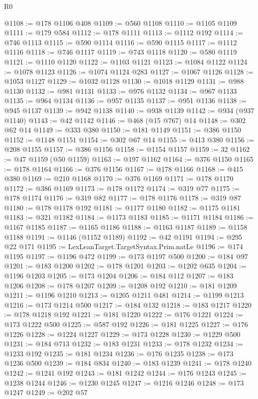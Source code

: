 \begin{lexlean}{R0}
\begin{coremodule}
@1108 := @178 @1106 @408
@1109 := @560 @1108
@1110 := @1105 @1109
@1111 := @179 @584
@1112 := @178 @1111
@1113 := @1112 @192
@1114 := @746 @1113
@1115 := @590 @1114
@1116 := @590 @1115
@1117 := @1112 @1116
@1118 := @746 @1117
@1119 := @743 @1118
@1120 := @580 @1119
@1121 := @1110 @1120
@1122 := @1103 @1121
@1123 := @1084 @1122
@1124 := @1078 @1123
@1126 := @1074 @1124 @283
@1127 := @1067 @1126
@1128 := @1053 @1127
@1129 := @1032 @1128
@1130 := @1018 @1129
@1131 := @988 @1130
@1132 := @981 @1131
@1133 := @976 @1132
@1134 := @967 @1133
@1135 := @964 @1134
@1136 := @957 @1135
@1137 := @951 @1136
@1138 := @945 @1137
@1139 := @942 @1138
@1140 := @938 @1139
@1142 := @934 (@937 @1140)
@1143 := @42 @1142
@1146 := @468 (@15 @767) @14
@1148 := @302 @62 @14
@1149 := @333 @380
@1150 := @181 @1149
@1151 := @386 @1150
@1152 := @1148 @1151
@1154 := @302 @67 @14
@1155 := @413 @380
@1156 := @208 @1155
@1157 := @386 @1156
@1158 := @1154 @1157
@1159 := 32
@1162 := @47 @1159 (@50 @1159)
@1163 := @197 @1162
@1164 := @376 @1150
@1165 := @178 @1164
@1166 := @376 @1156
@1167 := @178 @1166
@1168 := @415 @380
@1169 := @210 @1168
@1170 := @376 @1169
@1171 := @178 @1170
@1172 := @386 @1169
@1173 := @178 @1172
@1174 := @319 @77
@1175 := @178 @1174
@1176 := @319 @82
@1177 := @178 @1176
@1178 := @319 @87
@1180 := @178 @1178 @192
@1181 := @1177 @1180
@1182 := @1175 @1181
@1183 := @321 @1182
@1184 := @1173 @1183
@1185 := @1171 @1184
@1186 := @1167 @1185
@1187 := @1165 @1186
@1188 := @1163 @1187
@1189 := @1158 @1188
@1191 := @1146 (@1152 @1189)
@1192 := @42 @1191
@1194 := @295 @22 @171
@1195 := LexLeanTarget.TargetSyntax.Prim.natLe
@1196 := @174 @1195
@1197 := @1196 @472
@1199 := @173 @1197 @500
@1200 := @184 @97
@1201 := @183 @1200
@1202 := @178 @1201
@1203 := @1202 @635
@1204 := @1196 @1203
@1205 := @173 @1204
@1206 := @184 @112
@1207 := @183 @1206
@1208 := @178 @1207
@1209 := @1208 @192
@1210 := @181 @1209
@1211 := @1196 @1210
@1213 := @1205 @1211 @481
@1214 := @1199 @1213
@1216 := @173 @1214 @500
@1217 := @184 @132
@1218 := @183 @1217
@1220 := @178 @1218 @192
@1221 := @181 @1220
@1222 := @176 @1221
@1224 := @173 @1222 @500
@1225 := @587 @192
@1226 := @181 @1225
@1227 := @176 @1226
@1228 := @1224 @1227
@1229 := @173 @1228
@1230 := @1229 @500
@1231 := @184 @713
@1232 := @183 @1231
@1233 := @178 @1232
@1234 := @1233 @192
@1235 := @181 @1234
@1236 := @176 @1235
@1238 := @173 @1236 @500
@1239 := @184 @834
@1240 := @183 @1239
@1241 := @178 @1240
@1242 := @1241 @192
@1243 := @181 @1242
@1244 := @176 @1243
@1245 := @1238 @1244
@1246 := @1230 @1245
@1247 := @1216 @1246
@1248 := @173 @1247
@1249 := @202 @57

\end{coremodule}
\end{lexlean}
